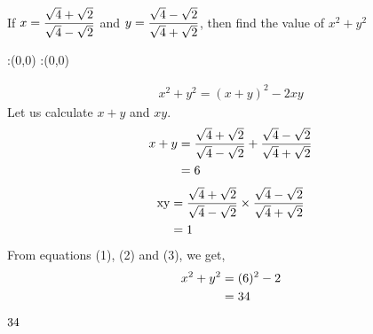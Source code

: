 

\question[2] If $x = \dfrac{\sqrt{4}+\sqrt{2}}{\sqrt{4}-\sqrt{2}}$
and $y = \dfrac{\sqrt{4}-\sqrt{2}}{\sqrt{4}+\sqrt{2}}$, then find
the value of $x^2+y^2$


\watchout

\ifprintanswers
  \begin{marginfigure}
      :(0,0)
      :(0,0)
    \figdrawbegin{}
      \figdrawline [100,101]
    \figdrawend
    \figvisu{\figBoxA}{}{%
    }
    \centerline{\box\figBoxA}
  \end{marginfigure}
\fi 

\begin{solution}[\halfpage]
  \begin{align}
    x^2+y^2=(x+y)^2 - 2xy
  \end{align}
  Let us calculate $x+y$ and $xy$.
  \begin{align}
    x + y &= \dfrac{\sqrt{4}+\sqrt{2}}{\sqrt{4}-\sqrt{2}} +
      \dfrac{\sqrt{4}-\sqrt{2}}{\sqrt{4}+\sqrt{2}} \\ \nonumber
          &= 6
  \end{align}
  \begin{align}
    \text{xy} &= \dfrac{\sqrt{4}+\sqrt{2}}{\sqrt{4}-\sqrt{2}} \times
      \dfrac{\sqrt{4}-\sqrt{2}}{\sqrt{4}+\sqrt{2}} \\ \nonumber
          &= 1
  \end{align}
  From equations (1), (2) and (3), we get,
  \begin{align}
    x^2 + y^2 &= (6)^2 - 2 \\ \nonumber
              &= 34
  \end{align}
  
\end{solution}

\ifprintanswers\begin{codex}$34$\end{codex}\fi
